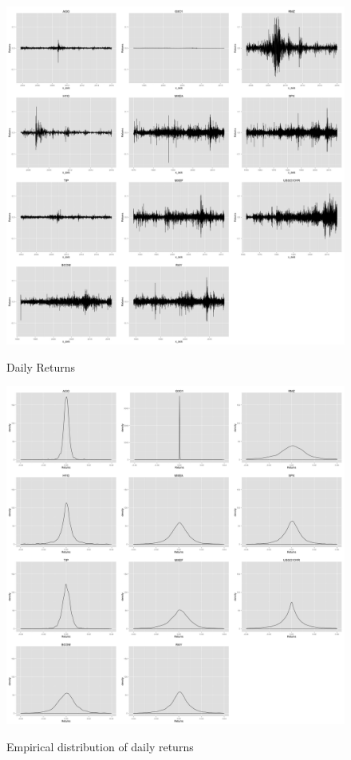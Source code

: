 \iffalse

\begin{figure}[h]
\caption{Daily Returns} 
\centering 
\includegraphics[width=15cm]{../results/returns}
\label{fig: dailyReturns}
\end{figure}

\begin{figure}[h]
\caption{Empirical distribution of daily returns} 
\centering 
\includegraphics[width=15cm]{../results/returns_dist}
\label{fig: returnsDist}
\end{figure}

